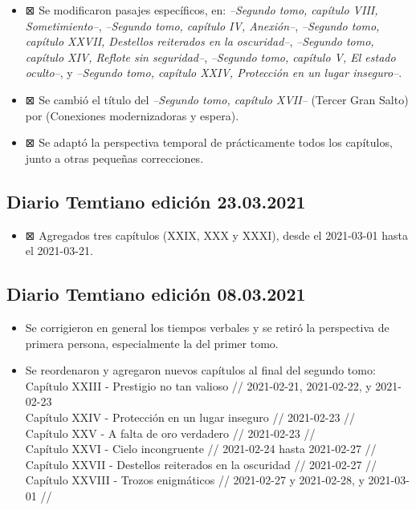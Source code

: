 \documentclass[
]{book}
\providecommand{\tightlist}{%
  \setlength{\itemsep}{0pt}\setlength{\parskip}{0pt}}
\begin{document}
\begin{itemize}
\item
  ⊠ Se modificaron pasajes específicos, en: \emph{--Segundo tomo, capítulo VIII, Sometimiento--}, \emph{--Segundo tomo, capítulo IV, Anexión--}, \emph{--Segundo tomo, capítulo XXVII, Destellos reiterados en la oscuridad--}, \emph{--Segundo tomo, capítulo XIV, Reflote sin seguridad--}, \emph{--Segundo tomo, capítulo V, El estado oculto--}, y \emph{--Segundo tomo, capítulo XXIV, Protección en un lugar inseguro--}.
\item
  ⊠ Se cambió el título del \emph{--Segundo tomo, capítulo XVII--} (Tercer Gran Salto) por (Conexiones modernizadoras y espera).
\item
  ⊠ Se adaptó la perspectiva temporal de prácticamente todos los capítulos, junto a otras pequeñas correcciones.
\end{itemize}

\hypertarget{diario-temtiano-ediciuxf3n-23.03.2021}{%
\subsection*{Diario Temtiano edición 23.03.2021}\label{diario-temtiano-ediciuxf3n-23.03.2021}}

\begin{itemize}
\tightlist
\item
  ⊠ Agregados tres capítulos (XXIX, XXX y XXXI), desde el 2021-03-01 hasta el 2021-03-21.
\end{itemize}

\hypertarget{diario-temtiano-ediciuxf3n-08.03.2021}{%
\subsection*{Diario Temtiano edición 08.03.2021}\label{diario-temtiano-ediciuxf3n-08.03.2021}}

\begin{itemize}
\item
  Se corrigieron en general los tiempos verbales y se retiró la perspectiva de primera persona, especialmente la del primer tomo.
\item
  Se reordenaron y agregaron nuevos capítulos al final del segundo tomo:
  Capítulo XXIII - Prestigio no tan valioso // 2021-02-21, 2021-02-22, y 2021-02-23~\\
  Capítulo XXIV - Protección en un lugar inseguro // 2021-02-23 //~\\
  Capítulo XXV - A falta de oro verdadero // 2021-02-23 //~\\
  Capítulo XXVI - Cielo incongruente // 2021-02-24 hasta 2021-02-27 //~\\
  Capítulo XXVII - Destellos reiterados en la oscuridad // 2021-02-27 //~\\
  Capítulo XXVIII - Trozos enigmáticos // 2021-02-27 y 2021-02-28, y 2021-03-01 //
\end{itemize}
\end{document}
